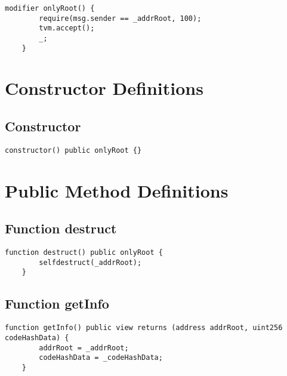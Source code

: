 \begin{lstlisting}[firstnumber=10]
    modifier onlyRoot() {
        require(msg.sender == _addrRoot, 100);
        tvm.accept();
        _;
    }
\end{lstlisting}

\section{Constructor Definitions}


\subsection{Constructor}

\begin{lstlisting}[firstnumber=16]
    constructor() public onlyRoot {}
\end{lstlisting}

\section{Public Method Definitions}


\subsection{Function destruct}


\begin{lstlisting}[firstnumber=23]
    function destruct() public onlyRoot {
        selfdestruct(_addrRoot);
    }
\end{lstlisting}

\subsection{Function getInfo}

\begin{lstlisting}[firstnumber=18]
    function getInfo() public view returns (address addrRoot, uint256 codeHashData) {
        addrRoot = _addrRoot;
        codeHashData = _codeHashData;
    }
\end{lstlisting}
